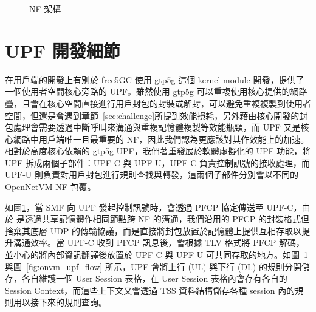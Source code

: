 \begin{figure}[htbp]
    \caption[\LHCN NF 架構]{{\footnotesize \LHCN NF 架構}}
    \label{fig:onvm_nf_arch}
\end{figure}

\section{UPF 開發細節}
\label{sec:upf_porting}

在用戶端的開發上有別於 free5GC 使用 gtp5g 這個 kernel module 開發，\LHCN 提供了一個使用者空間核心旁路的 UPF。雖然使用 gtp5g 可以重複使用核心提供的網路疊，且會在核心空間直接進行用戶封包的封裝或解封，可以避免重複複製到使用者空間，但還是會遇到章節~\ref{sec:challenge}所提到效能損耗，另外藉由核心開發的封包處理會需要透過中斷呼叫來溝通\cite{interrupt_process}與重複記憶體複製等效能瓶頸，而 UPF 又是核心網路中用戶端唯一且最重要的 NF，因此我們認為更應該對其作效能上的加速。相對於高度核心依賴的 gtp5g-UPF，我們著重發展於軟體虛擬化的 UPF 功能，將 UPF 拆成兩個子部件：UPF-C 與 UPF-U，UPF-C 負責控制訊號的接收處理，而 UPF-U 則負責對用戶封包進行規則查找與轉發，這兩個子部件分別會以不同的 OpenNetVM NF 包覆。

如圖\ref{fig:onvm_nf_arch}，當 SMF 向 UPF 發起控制訊號時，會透過 PFCP 協定傳送至 UPF-C，由於 \LHCN 是透過共享記憶體作相同節點跨 NF 的溝通，我們沿用的 PFCP 的封裝格式但捨棄其底層 UDP 的傳輸協議，而是直接將封包放置於記憶體上提供互相存取以提升溝通效率。當 UPF-C 收到 PFCP 訊息後，會根據 TLV 格式將 PFCP 解碼，並小心的將內部資訊翻譯後放置於 UPF-C 與 UPF-U 可共同存取的地方。如圖~\ref{fig:onvm_nf_arch} 與圖~\ref{fig:onvm_upf_flow} 所示，UPF 會將上行 (UL) 與下行 (DL) 的規則分開儲存，各自維護一個 User Session 表格，在 User Session 表格內會存有各自的 Session Context，而這些上下文又會透過 TSS 資料結構儲存各種 session 內的規則用以接下來的規則查詢。

